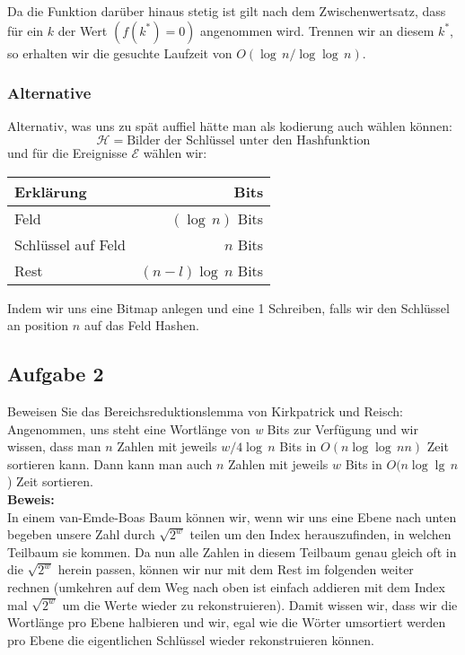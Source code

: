 \documentclass[11pt,a4paper,ngerman]{article}
\begin{document}
Da die Funktion darüber hinaus stetig ist gilt nach dem Zwischenwertsatz, dass für ein $k$ der Wert $(f(k^*) = 0)$ angenommen wird. Trennen wir an diesem $k^*$, so erhalten
wir die gesuchte Laufzeit von $O(\log \, n / \log \log \, n)$.

\subsubsection*{Alternative}

Alternativ, was uns zu spät auffiel hätte man als kodierung auch wählen können:
$$
\mathcal{H} = \text{Bilder der Schlüssel unter den Hashfunktion}
$$
und für die Ereignisse $\mathcal{E}$ wählen wir:
\begin{center}
   \begin{tabularx}{0.7\textwidth}{l|r}
Erklärung & Bits\\
\hline
Feld & $(\log \, n)$ Bits\\
Schlüssel auf Feld & $ n$ Bits \\
Rest & $(n-l)\log \, n$ Bits
\end{tabularx}
\end{center}

Indem wir uns eine Bitmap anlegen und eine 1 Schreiben, falls wir den Schlüssel an position $n$ auf das Feld Hashen.

\subsection*{Aufgabe 2}

Beweisen Sie das Bereichsreduktionslemma von Kirkpatrick und Reisch: Angenommen, uns steht eine Wortlänge von \emph{w} Bits zur Verfügung und wir wissen, dass man $n$ Zahlen mit jeweils $w/4\log \, n$ Bits in $O(n \log\log \,n n)$ Zeit sortieren kann. Dann kann man auch $n$ Zahlen mit jeweils $w$ Bits in $O(n \log \lg \, n$) Zeit sortieren.\\

\noindent\textbf{Beweis:}\\

In einem van-Emde-Boas Baum können wir, wenn wir uns eine Ebene nach unten begeben unsere Zahl durch $\sqrt{2^w}$ teilen um den Index
herauszufinden, in welchen Teilbaum sie kommen. Da nun alle Zahlen in diesem Teilbaum genau gleich oft in die $\sqrt{2^w}$ herein passen, können wir nur mit dem Rest im folgenden weiter rechnen (umkehren auf dem Weg nach oben ist einfach addieren mit dem Index mal $\sqrt{2^w}$ um
die Werte wieder zu rekonstruieren). Damit wissen wir, dass wir die Wortlänge pro Ebene halbieren und wir, egal wie die Wörter umsortiert werden
pro Ebene die eigentlichen Schlüssel wieder rekonstruieren können.\\
\end{document}
